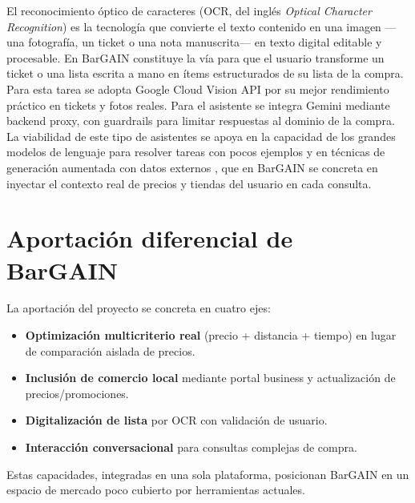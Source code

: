El reconocimiento \'optico de caracteres (OCR, del ingl\'es \emph{Optical Character Recognition})
es la tecnolog\'ia que convierte el texto contenido en una imagen ---una fotograf\'ia, un ticket o
una nota manuscrita--- en texto digital editable y procesable. En BarGAIN constituye la v\'ia para
que el usuario transforme un ticket o una lista escrita a mano en \'items estructurados de su lista
de la compra. Para esta tarea se adopta Google Cloud Vision API \cite{vision_docs} por su mejor
rendimiento pr\'actico en tickets y fotos reales. Para el asistente se integra Gemini \cite{gemini_docs} mediante
backend proxy, con guardrails para limitar respuestas al dominio de la compra. La viabilidad
de este tipo de asistentes se apoya en la capacidad de los grandes modelos de lenguaje para
resolver tareas con pocos ejemplos \cite{brown2020} y en t\'ecnicas de generaci\'on aumentada
con datos externos \cite{lewis2020}, que en BarGAIN se concreta en inyectar el contexto real
de precios y tiendas del usuario en cada consulta.

\section{Aportaci\'on diferencial de BarGAIN}

La aportaci\'on del proyecto se concreta en cuatro ejes:

\begin{itemize}
	\item \textbf{Optimizaci\'on multicriterio real} (precio + distancia + tiempo) en lugar de
		comparaci\'on aislada de precios.
	\item \textbf{Inclusi\'on de comercio local} mediante portal business y actualizaci\'on de
		precios/promociones.
	\item \textbf{Digitalizaci\'on de lista} por OCR con validaci\'on de usuario.
	\item \textbf{Interacci\'on conversacional} para consultas complejas de compra.
\end{itemize}

Estas capacidades, integradas en una sola plataforma, posicionan BarGAIN en un espacio
de mercado poco cubierto por herramientas actuales.
